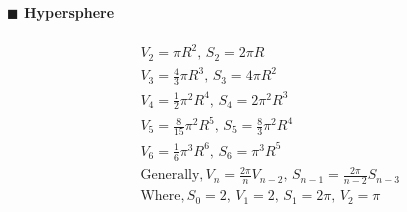\documentclass[10pt]{article}
\begin{document}
{\paragraph{$\blacksquare$ Hypersphere}
\begin{eqnarray*}
&& V_2=\pi R^2,\, S_2=2\pi R \\
&& V_3=\frac{4}{3}\pi R^3,\, S_3=4\pi R^2 \\
&& V_4=\frac{1}{2}\pi ^2 R^4,\, S_4=2\pi ^2 R^3 \\
&& V_5=\frac{8}{15}\pi ^2 R^5,\, S_5=\frac{8}{3}\pi ^2 R^4 \\
&& V_6=\frac{1}{6}\pi ^3 R^6,\, S_6=\pi ^3 R^5 \\
&& \mathrm{Generally}, V_n=\frac{2\pi}{n}V_{n-2},\, S_{n-1}=\frac{2\pi}{n-2}S_{n-3} \\
&& \mathrm{Where}, S_0=2,\, V_1=2,\, S_1=2\pi ,\, V_2=\pi
\end{eqnarray*}
}
\end{document}
